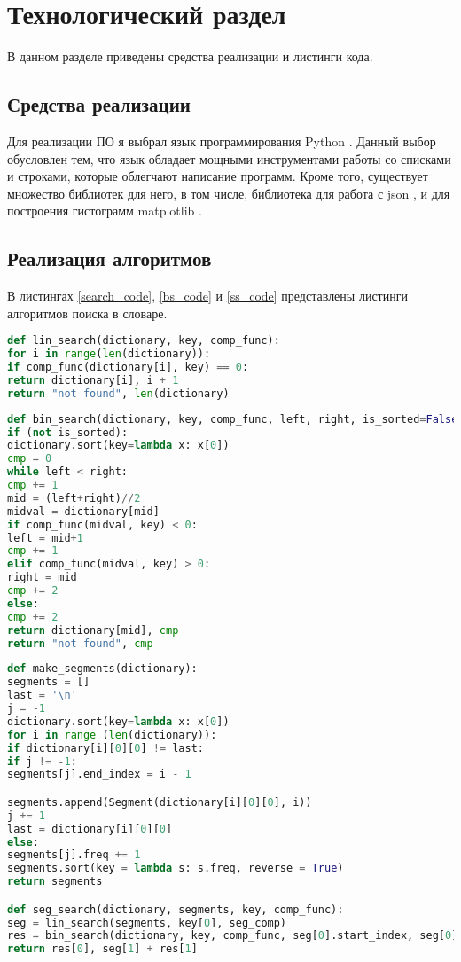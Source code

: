 \chapter{Технологический раздел}

В данном разделе приведены средства реализации и листинги кода.

\section{Средства реализации}

Для реализации ПО я выбрал язык программирования Python \cite{python}. Данный выбор обусловлен тем, что язык обладает мощными инструментами работы со списками и строками, которые облегчают написание программ. Кроме того, существует множество библиотек для него, в том числе, библиотека для работа с json \cite{json}, и для построения гистограмм matplotlib \cite{matplotlib}.

\section{Реализация алгоритмов}

В листингах \ref{search_code}, \ref{bs_code} и \ref{ss_code} представлены листинги алгоритмов поиска в словаре.

\begin{lstlisting}[label=search_code,caption=Алгоритм линейного поиска, language=Python]
def lin_search(dictionary, key, comp_func):
for i in range(len(dictionary)):
if comp_func(dictionary[i], key) == 0:
return dictionary[i], i + 1
return "not found", len(dictionary)
\end{lstlisting}

\begin{lstlisting}[label = bs_code,caption=Алгоритм двоичного поиска, language=Python]
def bin_search(dictionary, key, comp_func, left, right, is_sorted=False):
if (not is_sorted):
dictionary.sort(key=lambda x: x[0])
cmp = 0
while left < right:
cmp += 1
mid = (left+right)//2
midval = dictionary[mid]
if comp_func(midval, key) < 0:
left = mid+1
cmp += 1
elif comp_func(midval, key) > 0: 
right = mid
cmp += 2
else:
cmp += 2
return dictionary[mid], cmp
return "not found", cmp
\end{lstlisting}

\begin{lstlisting}[label=ss_code,caption=Алгоритм поиска по сегментам, language=Python]
def make_segments(dictionary):
segments = []
last = '\n'
j = -1
dictionary.sort(key=lambda x: x[0])
for i in range (len(dictionary)):
if dictionary[i][0][0] != last:
if j != -1:
segments[j].end_index = i - 1

segments.append(Segment(dictionary[i][0][0], i))
j += 1
last = dictionary[i][0][0]
else:
segments[j].freq += 1
segments.sort(key = lambda s: s.freq, reverse = True)
return segments

def seg_search(dictionary, segments, key, comp_func):
seg = lin_search(segments, key[0], seg_comp)
res = bin_search(dictionary, key, comp_func, seg[0].start_index, seg[0].end_index + 1, is_sorted=True)
return res[0], seg[1] + res[1]
\end{lstlisting}

